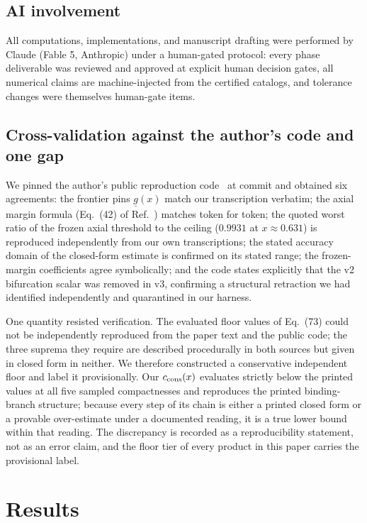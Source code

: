 \documentclass[11pt]{article}
\begin{document}
\subsection{AI involvement}

All computations, implementations, and manuscript drafting were performed
by Claude (Fable 5, Anthropic) under a human-gated protocol: every phase
deliverable was reviewed and approved at explicit human decision gates,
all numerical claims are machine-injected from the certified catalogs, and
tolerance changes were themselves human-gate items.

\subsection{Cross-validation against the author's code and one gap}

We pinned the author's public reproduction code~\cite{worldtube} at commit
\NmWtCommit{} and obtained six agreements: the frontier pins
$\underline{g}(x)$ match our transcription verbatim; the axial margin
formula (Eq.~(42) of Ref.~\cite{le-steering}) matches token for token; the
quoted worst ratio of the frozen axial threshold to the ceiling
($0.9931$ at $x \approx 0.631$) is reproduced independently from our own
transcriptions; the stated accuracy domain of the closed-form estimate is
confirmed on its stated range; the frozen-margin coefficients agree
symbolically; and the code states explicitly that the v2 bifurcation
scalar was removed in v3, confirming a structural retraction we had
identified independently and quarantined in our harness.

One quantity resisted verification. The evaluated floor values of Eq.~(73)
could not be independently reproduced from the paper text and the public
code; the three suprema they require are described procedurally in both
sources but given in closed form in neither. We therefore constructed a
conservative independent floor and label it provisionally. Our
$c_{\rm cons}(x)$ evaluates strictly below the printed values at all five
sampled compactnesses and reproduces the printed binding-branch structure;
because every step of its chain is either a printed closed form or a
provable over-estimate under a documented reading, it is a true lower
bound within that reading. The discrepancy is recorded as a
reproducibility statement, not as an error claim, and the floor tier of
every product in this paper carries the provisional label.

\section{Results}\label{sec:results}
\end{document}
